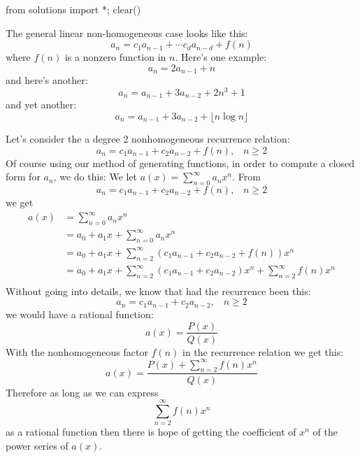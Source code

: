 \begin{python0}
from solutions import *; clear() 
\end{python0}

The general linear non-homogeneous case looks like this:
\[
a_n = c_1 a_{n-1} + \cdots c_d a_{n-d} + f(n)
\]
where $f(n)$ is a nonzero function in $n$.
Here's one example:
\[
a_n = 2a_{n-1} + n
\]
and here's another:
\[
a_n = a_{n-1} + 3a_{n-2} + 2n^3 + 1
\]
and yet another:
\[
a_n = a_{n-1} + 3a_{n-2} + \lfloor n \log n \rfloor
\]

Let's consider the a degree 2 nonhomogeneous recurrence relation:
\[
a_n = c_1 a_{n-1} + c_2 a_{n-2} + f(n), \,\,\,\,\, n \geq 2
\]
Of course using our method of generating functions,
in order to compute a closed form for $a_n$, we do this:
We let $a(x) = \sum_{n=0}^\infty a_n x^n$.
From 
\[
a_n = c_1 a_{n-1} + c_2 a_{n-2} + f(n), \,\,\,\,\, n \geq 2
\]
we get
\begin{align*}
a(x)
&= \sum_{n=0}^\infty a_n x^n \\
&= a_0 + a_1x + \sum_{n=0}^\infty a_n x^n \\
&= a_0 + a_1x + \sum_{n=2}^\infty (c_1 a_{n-1} + c_2 a_{n-2} + f(n))x^n \\
&= a_0 + a_1x + \sum_{n=2}^\infty (c_1 a_{n-1} + c_2 a_{n-2})x^n + 
\sum_{n=2}^\infty f(n)x^n \\
\end{align*}
Without going into details, we know that had the recurrence been this:
\[
a_n = c_1 a_{n-1} + c_2 a_{n-2}, \,\,\,\,\, n \geq 2
\]
we would have a rational function:
\[
a(x) = \frac{P(x)}{Q(x)}
\]
With the nonhomogeneous factor $f(n)$ in the recurrence relation we
get this:
\[
a(x) = \frac{P(x) + \sum_{n=2}^\infty f(n)x^n}{Q(x)}
\]
Therefore as long as we can express
\[
\sum_{n=2}^\infty f(n)x^n
\]
as a rational function then there is hope of getting the coefficient 
of $x^n$ of the power series of $a(x)$.

